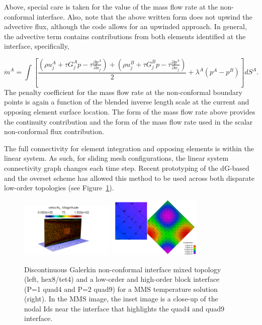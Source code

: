 Above, special care is taken for the value of the mass flow rate at the non-conformal interface. Also,
note that the above written form does not upwind the advective flux, although the code allows for an upwinded 
approach. In general, the advective term contains contributions from both elements identified at the interface, 
specifically,

\begin{equation} 
        \dot {m}^A = \int [\frac{(\rho u_j^A + \tau G_j^A p -\tau \frac{\partial p^A}{\partial x_j}) 
        				       + (\rho u_j^B+ \tau G_j^B p -\tau \frac{\partial p^A}{\partial x_j})}{2}
				       + \lambda^A ( p^A - p^B)] dS^A.
\label{mdotA}
\end{equation}
The penalty coefficient for the mass flow rate at the non-conformal boundary points is again a function of the 
blended inverse length scale at the current and opposing element surface location. The form of the mass flow 
rate above provides the continuity contribution and the form of the mass flow rate used in the scalar non-conformal
flux contribution.

The full connectivity for element integration and opposing elements is within the linear 
system. As such, for sliding mesh configurations, the linear system connectivity graph changes each time step. Recent prototyping of 
the dG-based and the overset scheme has allowed this method to be used across both disparate low-order 
topologies (see Figure~\ref{dgMixMatch}).

\begin{figure}[h!tp]
\centering
\includegraphics[clip,width=0.4\textwidth]{images/dgHex8Tet4Duct.png}
\includegraphics[clip,width=0.4\textwidth]{images/dgQuad4Quad9MMS.png}
\caption{Discontinuous Galerkin non-conformal interface mixed topology (left, hex8/tet4) and a low-order and high-order block interface 
(P=1 quad4 and P=2 quad9) for a MMS temperature solution (right). In the MMS image, the inset image is a close-up of the nodal 
Ids near the interface that highlights the quad4 and quad9 interface.}
\label{dgMixMatch}
\end{figure}
